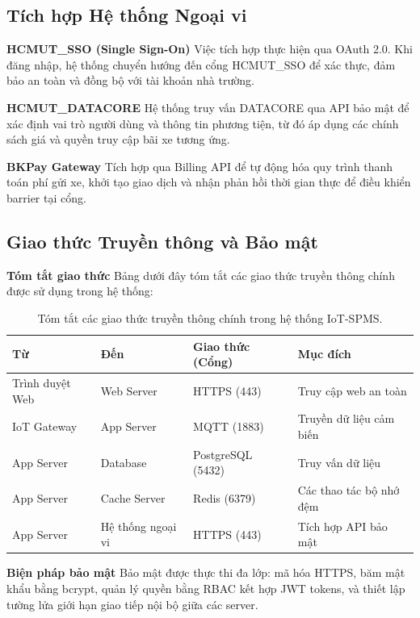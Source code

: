 \subsection{Tích hợp Hệ thống Ngoại vi}
\noindent \textbf{HCMUT\_SSO (Single Sign-On)} Việc tích hợp thực hiện qua OAuth 2.0. Khi đăng nhập, hệ thống chuyển hướng đến cổng HCMUT\_SSO để xác thực, đảm bảo an toàn và đồng bộ với tài khoản nhà trường.

\medskip
\noindent \textbf{HCMUT\_DATACORE} Hệ thống truy vấn DATACORE qua API bảo mật để xác định vai trò người dùng và thông tin phương tiện, từ đó áp dụng các chính sách giá và quyền truy cập bãi xe tương ứng.

\medskip
\noindent \textbf{BKPay Gateway} Tích hợp qua Billing API để tự động hóa quy trình thanh toán phí gửi xe, khởi tạo giao dịch và nhận phản hồi thời gian thực để điều khiển barrier tại cổng.

\subsection{Giao thức Truyền thông và Bảo mật}
\textbf{Tóm tắt giao thức} Bảng dưới đây tóm tắt các giao thức truyền thông chính được sử dụng trong hệ thống:
\begin{table}[H]
    \centering
    \caption{Tóm tắt các giao thức truyền thông chính trong hệ thống IoT-SPMS.}
    \label{tab:protocols}
    \begin{tabular}{|l|l|l|l|}
        \hline
        \textbf{Từ} & \textbf{Đến} & \textbf{Giao thức (Cổng)} & \textbf{Mục đích} \\ \hline
        Trình duyệt Web & Web Server & HTTPS (443) & Truy cập web an toàn \\ \hline
        IoT Gateway & App Server & MQTT (1883) & Truyền dữ liệu cảm biến \\ \hline
        App Server & Database & PostgreSQL (5432) & Truy vấn dữ liệu \\ \hline
        App Server & Cache Server & Redis (6379) & Các thao tác bộ nhớ đệm \\ \hline
        App Server & Hệ thống ngoại vi & HTTPS (443) & Tích hợp API bảo mật \\ \hline
    \end{tabular}
\end{table}

\noindent \textbf{Biện pháp bảo mật} Bảo mật được thực thi đa lớp: mã hóa HTTPS, băm mật khẩu bằng bcrypt, quản lý quyền bằng RBAC kết hợp JWT tokens, và thiết lập tường lửa giới hạn giao tiếp nội bộ giữa các server.

